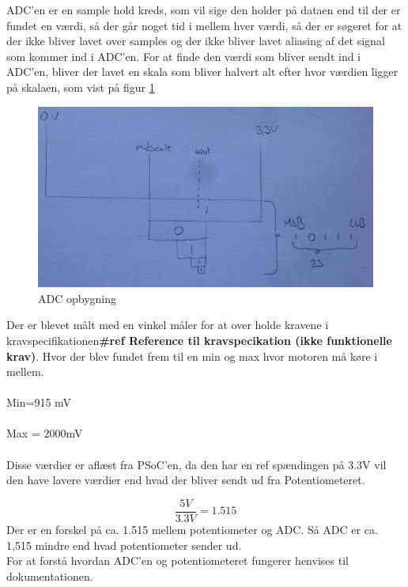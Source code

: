 ADC’en er en sample hold kreds, som vil sige den holder på dataen end til der er fundet en værdi, så der går noget tid i mellem hver værdi, så der er søgeret for at der ikke bliver lavet over samples og der ikke bliver lavet aliasing af det signal som kommer ind i ADC’en. For at finde den værdi som bliver sendt ind i ADC'en, bliver der lavet en skala som bliver halvert alt efter hvor værdien ligger på skalaen, som vist på figur \ref{fig:pot}

\begin{figure}[H]
	\centering
	\includegraphics[width=\textwidth]{Afsnit/DesignOgImplementering/images/ADC}
	\caption{ADC opbygning}
	\label{fig:pot}
	\end{figure}

Der er blevet målt med en vinkel måler for at over holde kravene i kravspecifikationen\textbf{\#ref Reference til kravspecikation (ikke funktionelle krav)}. Hvor der blev fundet frem til en min og max hvor motoren må køre i mellem. \\
\\
Min=915 mV\\
\\
Max = 2000mV\\
\\
Disse værdier er aflæst fra PSoC’en, da den har en ref spændingen på 3.3V vil den have lavere værdier end hvad der bliver sendt ud fra Potentiometeret.


\begin{equation}
 \frac {5V} {3.3V}= 1.515
\end{equation}
Der er en forskel på ca. 1.515   mellem potentiometer og ADC. Så ADC er ca. 1,515 mindre end hvad potentiometer sender ud.
\\
For at forstå hvordan ADC’en og potentiometeret fungerer henvises til dokumentationen.

